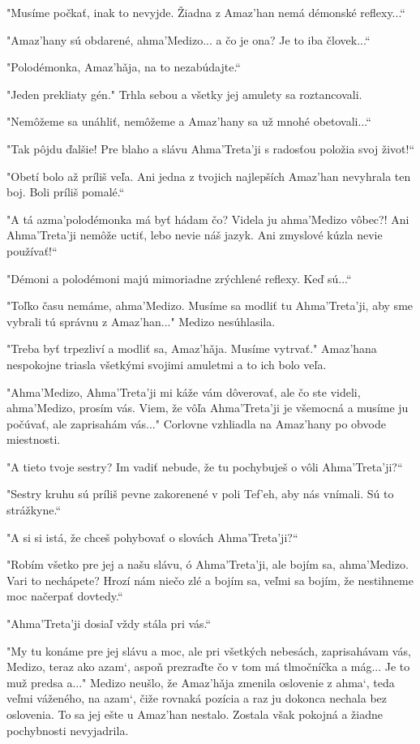 \documentclass{book}
\begin{document}
"$ $Musíme počkať, inak to nevyjde. Žiadna z Amaz'han nemá démonské reflexy...“

"$ $Amaz'hany sú obdarené, ahma'Medizo... a čo je ona? Je to iba človek...“

"$ $Polodémonka, Amaz'ha\v{}ja, na to nezabúdajte.“

"$ $Jeden prekliaty gén."$ $ Trhla sebou a všetky jej amulety sa roztancovali.

"$ $Nemôžeme sa unáhliť, nemôžeme a Amaz'hany sa už mnohé obetovali...“

"$ $Tak pôjdu ďalšie! Pre blaho a slávu Ahma'Treta'ji s radosťou položia svoj život!“

"$ $Obetí bolo až príliš veľa. Ani jedna z tvojich najlepších Amaz'han nevyhrala ten boj. Boli príliš pomalé.“

"$ $A tá azma'polodémonka má byť hádam čo? Videla ju ahma'Medizo vôbec?! Ani Ahma'Treta'ji nemôže uctiť, lebo nevie náš jazyk. Ani zmyslové kúzla nevie používať!“

"$ $Démoni a polodémoni majú mimoriadne zrýchlené reflexy. Keď sú...“

"$ $Toľko času nemáme, ahma'Medizo. Musíme sa modliť tu Ahma'Treta'ji, aby sme vybrali tú správnu z Amaz'han..."$ $ Medizo nesúhlasila.

"$ $Treba byť trpezliví a modliť sa, Amaz'ha\v{}ja. Musíme vytrvať."$ $ Amaz'hana nespokojne triasla všetkými svojimi amuletmi a to ich bolo veľa.

"$ $Ahma'Medizo, Ahma'Treta'ji mi káže vám dôverovať, ale čo ste videli, ahma'Medizo, prosím vás. Viem, že vôľa Ahma'Treta'ji je všemocná a musíme ju počúvať, ale zaprisahám vás..."$ $ Corlovne vzhliadla na Amaz'hany po obvode miestnosti.

"$ $A tieto tvoje sestry? Im vadiť nebude, že tu pochybuješ o vôli Ahma'Treta'ji?“

"$ $Sestry kruhu sú príliš pevne zakorenené v poli Tef'eh, aby nás vnímali. Sú to strážkyne.“

"$ $A si si istá, že chceš pohybovať o slovách Ahma'Treta'ji?“

"$ $Robím všetko pre jej a našu slávu, ó Ahma'Treta'ji, ale bojím sa, ahma'Medizo. Vari to nechápete? Hrozí nám niečo zlé a bojím sa, veľmi sa bojím, že nestihneme moc načerpať dovtedy.“

"$ $Ahma'Treta'ji dosiaľ vždy stála pri vás.“

"$ $My tu konáme pre jej slávu a moc, ale pri všetkých nebesách, zaprisahávam vás, Medizo, teraz ako azam‘, aspoň prezraďte čo v tom má tlmočníčka a mág... Je to muž predsa a..."$ $ Medizo neušlo, že Amaz'ha\v{}ja zmenila oslovenie z ahma‘, teda veľmi váženého, na azam‘, čiže rovnaká pozícia a raz ju dokonca nechala bez oslovenia. To sa jej ešte u Amaz'han nestalo. Zostala však pokojná a žiadne pochybnosti nevyjadrila.
\end{document}
